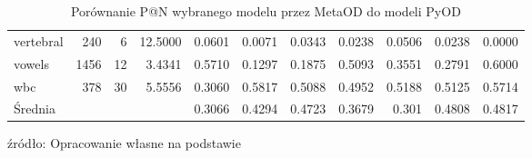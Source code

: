 \begin{sidewaystable}
\begin{tabular}{lrrrrrrrrrr}
 vertebral &       240 &             6 &       12.5000 & 0.0601 & 0.0071 &   0.0343 & 0.0238 & 0.0506 & 0.0238 &  0.0000 \\
    vowels &      1456 &            12 &        3.4341 & 0.5710 & 0.1297 &   0.1875 & 0.5093 & 0.3551 & 0.2791 &  0.6000 \\
       wbc &       378 &            30 &        5.5556 & 0.3060 & 0.5817 &   0.5088 & 0.4952 & 0.5188 & 0.5125 &  0.5714 \\
\bottomrule
 Średnia & & & &0.3066&
0.4294&
0.4723&
0.3679&
0.301&
0.4808&
0.4817&
\end{tabular}
\caption{Porównanie P@N wybranego modelu przez MetaOD do modeli PyOD}
\footnotesize{źródło: Opracowanie własne na podstawie \cite{zhao2019pyod}}
\end{sidewaystable}

